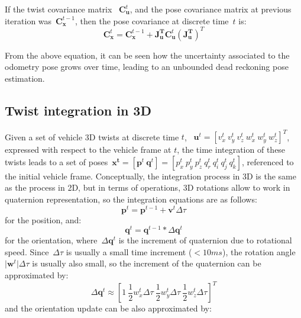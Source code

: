 If the twist covariance matrix ~$\mathbf{C}^t_{\mathbf{u}}$, and the pose covariance matrix at previous iteration was~$\mathbf{C}^{t-1}_{\mathbf{x}}$, then the pose covariance at discrete time~$t$ is: 
\begin{equation}
 \mathbf{C}^t_{\mathbf{x}} = \mathbf{C}^{t-1}_{\mathbf{x}} +  
    \mathbf{J}^{\mathbf{T}}_{\mathbf{u}}
    \mathbf{C}^t_{\mathbf{u}}
    (\mathbf{J}^{\mathbf{T}}_{\mathbf{u}})^T
\end{equation}

From the above equation, it can be seen how the uncertainty associated to the odometry pose grows over time, leading to an unbounded dead reckoning pose estimation.

\subsection{Twist integration in 3D}
Given a set of vehicle 3D twists at discrete time $t$, ~$\mathbf{u}^t=[v^t_x\ v^t_y\ v^t_z\ w^t_x \ w^t_y \ w^t_z]^T$, expressed with respect to the vehicle frame at $t$, the time integration of these twists leads to a set of poses~$\mathbf{x^t}=[\mathbf{p}^t\ \mathbf{q}^t ]=[p^t_x\ p^t_y\ p^t_z\ q^t_r\ q^t_i\ q^t_j\ q^t_k]$, referenced to the initial vehicle frame. Conceptually, the integration process in 3D is the same as the process in 2D, but in terms of operations, 3D rotations allow to work in quaternion representation, so the integration equations are as follows: 
\begin{equation}
\mathbf{p}^t = \mathbf{p}^{t-1} + \mathbf{v}^t\Delta\tau
\end{equation}
for the position, and: 
\begin{equation}
\mathbf{q}^t = \mathbf{q}^{t-1}*\Delta\mathbf{q}^t
\end{equation}
for the orientation, where~$\Delta\mathbf{q}^t$ is the increment of quaternion due to rotational speed. Since~$\Delta\tau$ is usually a small time increment ($<10ms$), the rotation angle $\vert\mathbf{w}^t \vert \Delta\tau$ is usually also small, so  the increment of the quaternion can be approximated by: 
\begin{equation}
 \Delta\mathbf{q}^t \approx [1\ \frac{1}{2}w^t_x\Delta\tau\ \frac{1}{2}w^t_y\Delta\tau\ \frac{1}{2}w^t_z\Delta\tau ]^T
\end{equation}
and the orientation update can be also approximated by: 
